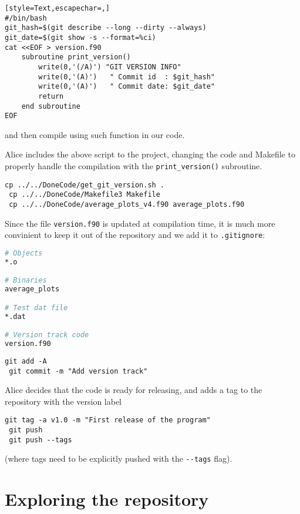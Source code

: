 \documentclass[a4paper,10pt]{article}
\begin{document}
\begin{lstlisting}[style=Text,escapechar=,]
#/bin/bash
git_hash=$(git describe --long --dirty --always)
git_date=$(git show -s --format=%ci)
cat <<EOF > version.f90
    subroutine print_version()
        write(0,'(/A)') "GIT VERSION INFO"
        write(0,'(A)')   " Commit id  : $git_hash"
        write(0,'(A)')   " Commit date: $git_date"
        return
    end subroutine 
EOF
\end{lstlisting}
and then compile using such function in our code.

Alice includes the above script to the project, changing the code and Makefile to properly handle the compilation with the \texttt{print\_version()} subroutine.

\begin{lstlisting}[style=AliceFake]
 cp ../../DoneCode/get_git_version.sh .
 cp ../../DoneCode/Makefile3 Makefile
 cp ../../DoneCode/average_plots_v4.f90 average_plots.f90
\end{lstlisting}

Since the file \texttt{version.f90} is updated at compilation time, it is much more convinient to keep it out of the repository and we add it to \texttt{.gitignore}:

\begin{lstlisting}[style=Text,language=bash,commentstyle=\color{blue}]
# Objects
*.o

# Binaries
average_plots

# Test dat file
*.dat

# Version track code
version.f90
\end{lstlisting}

\begin{lstlisting}[style=Alice]
 git add -A
 git commit -m "Add version track"
\end{lstlisting}

Alice decides that the code is ready for releasing, and adds a tag to the repository with the version label

\begin{lstlisting}[style=Alice]
 git tag -a v1.0 -m "First release of the program"
 git push 
 git push --tags
\end{lstlisting}
(where tags need to be explicitly pushed with the \texttt{-{}-tags} flag).

\clearpage

\section{Exploring the repository}
\end{document}
